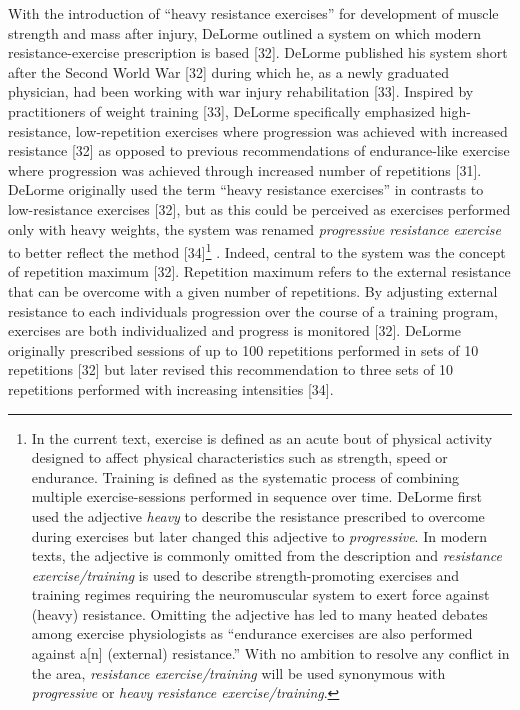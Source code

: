\documentclass[twoside,10pt]{gihclass} %
\begin{document}
With the introduction of ``heavy resistance exercises'' for development of muscle strength and mass after injury, DeLorme outlined a system on which modern resistance-exercise prescription is based {[}32{]}.
DeLorme published his system short after the Second World War {[}32{]}
during which he, as a newly graduated physician, had been working with war injury rehabilitation
{[}33{]}.
Inspired by practitioners of weight training {[}33{]},
DeLorme specifically emphasized high-resistance, low-repetition exercises where progression was achieved with increased resistance {[}32{]} as opposed to previous recommendations of endurance-like exercise where progression was achieved through increased number of repetitions
{[}31{]}.
DeLorme originally used the term ``heavy resistance exercises'' in contrasts to low-resistance exercises {[}32{]}, but as this could be perceived as exercises performed only with heavy weights, the system was renamed \emph{progressive resistance exercise} to better reflect the method
{[}34{]}\footnote{In the current text, exercise is defined as an acute bout of physical activity designed to affect physical characteristics such as strength, speed or endurance. Training is defined as the systematic process of combining multiple exercise-sessions performed in sequence over time. DeLorme first used the adjective \emph{heavy} to describe the resistance prescribed to overcome during exercises but later changed this adjective to \emph{progressive}. In modern texts, the adjective is commonly omitted from the description and \emph{resistance exercise/training} is used to describe strength-promoting exercises and training regimes requiring the neuromuscular system to exert force against (heavy) resistance. Omitting the adjective has led to many heated debates among exercise physiologists as ``endurance exercises are also performed against a{[}n{]} (external) resistance.'' With no ambition to resolve any conflict in the area, \emph{resistance exercise/training} will be used synonymous with \emph{progressive} or \emph{heavy} \emph{resistance exercise/training}.}
.
Indeed, central to the system was the concept of repetition maximum {[}32{]}.
Repetition maximum refers to the external resistance that can be overcome with a given number of repetitions.
By adjusting external resistance to each individuals progression over the course of a training program, exercises are both individualized and progress is monitored {[}32{]}.
DeLorme originally prescribed sessions of up to 100 repetitions performed in sets of 10 repetitions {[}32{]} but later revised this recommendation to three sets of 10 repetitions performed with increasing intensities
{[}34{]}.
\end{document}
